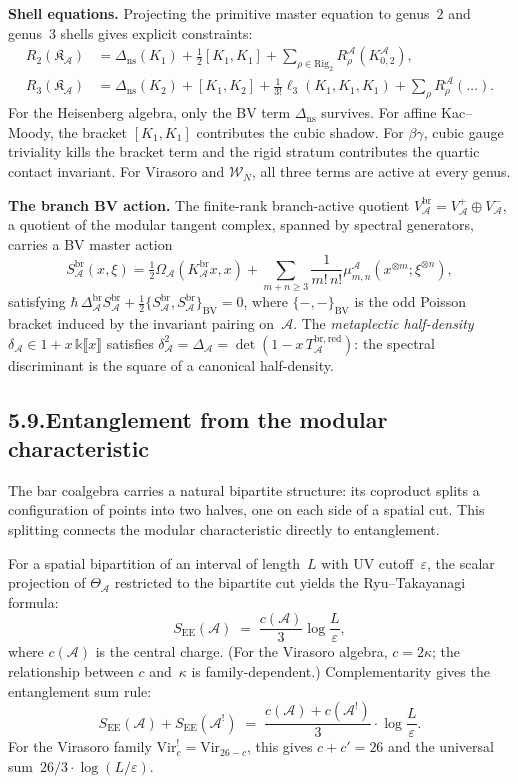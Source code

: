 \documentclass[11pt]{report}
\theoremstyle{definition}
\theoremstyle{remark}
\providecommand{\cA}{\mathcal{A}}
\providecommand{\Bbbk}{\mathbb{k}}
\numberwithin{equation}{section}
\begin{document}
\noindent\textbf{Shell equations.}\enspace
Projecting the primitive master equation to genus~$2$ and
genus~$3$ shells gives explicit constraints:
\begin{align*}
R_2(\mathfrak K_\cA)
&=\Delta_{\mathrm{ns}}(K_1)
 +\tfrac12[K_1,K_1]
 +\textstyle\sum_{\rho\in\mathrm{Rig}_2}R_\rho^\cA(K_{0,2}^\cA),\\
R_3(\mathfrak K_\cA)
&=\Delta_{\mathrm{ns}}(K_2)
 +[K_1,K_2]
 +\tfrac{1}{3!}\ell_3(K_1,K_1,K_1)
 +\textstyle\sum_\rho R_\rho^\cA(\ldots).
\end{align*}
For the Heisenberg algebra, only the BV term
$\Delta_{\mathrm{ns}}$ survives. For affine Kac--Moody,
the bracket $[K_1,K_1]$ contributes the cubic shadow. For
$\beta\gamma$, cubic gauge triviality kills the bracket term
and the rigid stratum contributes the quartic contact
invariant. For Virasoro and $\mathcal W_N$, all three terms
are active at every genus.

\medskip

\noindent\textbf{The branch BV action.}\enspace
The finite-rank branch-active quotient
$V_\cA^{\mathrm{br}}=V_\cA^+\oplus V_\cA^-$, a
quotient of the modular tangent complex,
spanned by spectral generators, carries a BV master action
\[
S_\cA^{\mathrm{br}}(x,\xi)
=\tfrac12\Omega_\cA(K_\cA^{\mathrm{br}}x,x)
+\sum_{m+n\geq 3}
\frac{1}{m!\,n!}\mu_{m,n}^\cA(x^{\otimes m};\xi^{\otimes n}),
\]
satisfying
$\hbar\,\Delta_\cA^{\mathrm{br}}S_\cA^{\mathrm{br}}
+\tfrac12\{S_\cA^{\mathrm{br}},S_\cA^{\mathrm{br}}\}_{\mathrm{BV}}
=0$,
where $\{-,-\}_{\mathrm{BV}}$ is the odd Poisson bracket
induced by the invariant pairing on~$\cA$.
The \emph{metaplectic half-density}
$\delta_\cA\in 1+x\,\Bbbk\llbracket x\rrbracket$ satisfies
$\delta_\cA^2=\Delta_\cA=\det(1-x\,T_\cA^{\mathrm{br,red}})$:
the spectral discriminant is the square of a canonical
half-density.

\subsection*{5.9.\enspace Entanglement from the modular characteristic}

The bar coalgebra carries a natural bipartite structure: its
coproduct splits a configuration of points into two halves, one on
each side of a spatial cut. This splitting connects the modular
characteristic directly to entanglement.

For a
spatial bipartition of an interval of length~$L$ with UV
cutoff~$\varepsilon$, the scalar projection of $\Theta_\cA$
restricted to the bipartite cut yields the
Ryu--Takayanagi formula:
\[
S_{\mathrm{EE}}(\cA)
\;=\;
\frac{c(\cA)}{3}\log\frac{L}{\varepsilon},
\]
where $c(\cA)$ is the central charge.
(For the Virasoro algebra, $c=2\kappa$; the relationship between
$c$ and~$\kappa$ is family-dependent.)
Complementarity gives the entanglement sum rule:
\[
S_{\mathrm{EE}}(\cA)+S_{\mathrm{EE}}(\cA^!)
\;=\;
\frac{c(\cA)+c(\cA^!)}{3}\cdot\log\frac{L}{\varepsilon}.
\]
For the Virasoro family $\mathrm{Vir}_c^!=\mathrm{Vir}_{26-c}$,
this gives $c+c'=26$ and the universal sum~$26/3\cdot\log(L/\varepsilon)$.
\end{document}
